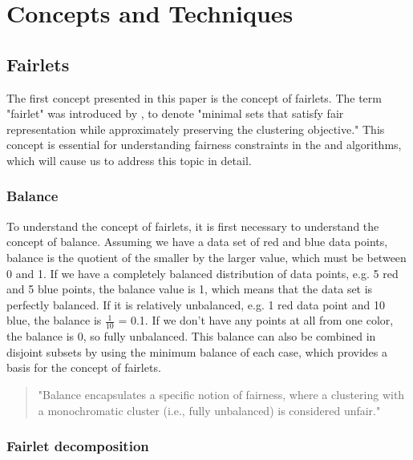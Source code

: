 \section{Concepts and Techniques}


\subsection{Fairlets}
\label{fairlets}

The first concept presented in this paper is the concept of fairlets. The term "fairlet" was introduced by  \textcite[]{Chierichetti2018}, to denote "minimal sets that satisfy fair representation
while approximately preserving the clustering objective." \autocite[1]{Chierichetti2018} This concept is essential for understanding fairness constraints in the  and  algorithms, which will cause us to address this topic in detail.

\subsubsection{Balance}

To understand the concept of fairlets, it is first necessary to understand the concept of balance. Assuming we have a data set of red and blue data points, balance is the quotient of the smaller by the larger value, which must be between 0 and 1. If we have a completely balanced distribution of data points, e.g. 5 red and 5 blue points, the balance value is 1, which means that the data set is perfectly balanced. If it is relatively unbalanced, e.g. 1 red data point and 10 blue, the balance is $\frac{1}{10}$ = 0.1. If we don't have any points at all from one color, the balance is 0, so fully unbalanced. This balance can also be combined in disjoint subsets by using the minimum balance of each case, which provides a basis for the concept of fairlets. \autocite[4]{Chierichetti2018}

\begin{quote}
"Balance encapsulates a specific notion of fairness, where a clustering with a monochromatic cluster (i.e., fully unbalanced) is considered unfair."
\autocite[4]{Chierichetti2018}
\end{quote}

\subsubsection{Fairlet decomposition}

